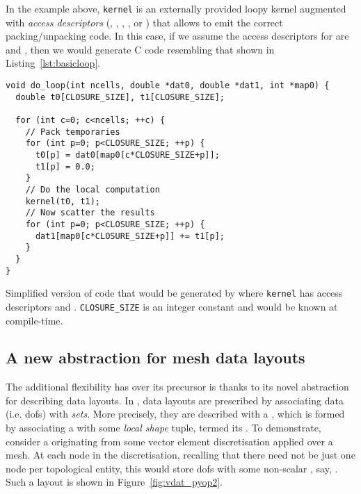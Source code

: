 In the example above, \texttt{kernel} is an externally provided loopy kernel augmented with \textit{access descriptors} (, , , ,  or ) that allows  to emit the correct packing/unpacking code.
In this case, if we assume the access descriptors for  are  and , then we would generate C code resembling that shown in Listing~\ref{lst:basicloop}.

\begin{listing}
  \begin{verbatim}
void do_loop(int ncells, double *dat0, double *dat1, int *map0) {
  double t0[CLOSURE_SIZE], t1[CLOSURE_SIZE];

  for (int c=0; c<ncells; ++c) {
    // Pack temporaries
    for (int p=0; p<CLOSURE_SIZE; ++p) {
      t0[p] = dat0[map0[c*CLOSURE_SIZE+p]];
      t1[p] = 0.0;
    }
    // Do the local computation
    kernel(t0, t1);
    // Now scatter the results
    for (int p=0; p<CLOSURE_SIZE; ++p) {
      dat1[map0[c*CLOSURE_SIZE+p]] += t1[p];
    }
  }
}
  \end{verbatim}
  \caption{
    Simplified version of code that would be generated by  where \texttt{kernel} has access descriptors  and .
    \texttt{CLOSURE_SIZE} is an integer constant and would be known at compile-time.
  }
  \label{lst:basicloop}
\end{listing}

\subsection{A new abstraction for mesh data layouts}

The additional flexibility  has over its precursor  is thanks to its novel abstraction for describing data layouts.
In , data layouts are prescribed by associating data (i.e. \glspl{dof}) with \textit{sets}.
More precisely, they are described with a , which is formed by associating a  with some \textit{local shape} tuple, termed its .
To demonstrate, consider a   originating from some vector element discretisation applied over a mesh.
At each node in the discretisation, recalling that there need not be just one node per topological entity, this  would store \glspl{dof} with some non-scalar , say, .
Such a layout is shown in Figure~\ref{fig:vdat_pyop2}.

